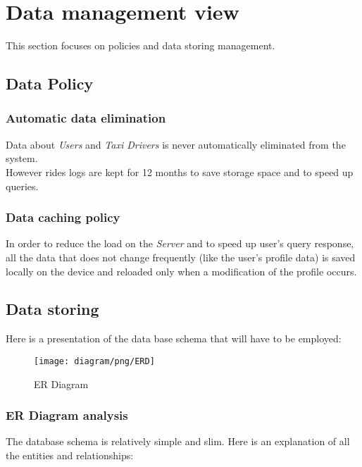 \section{Data management view} %
\label{sec:data_management}
This section focuses on policies and data storing management.\\
\subsection{Data Policy} %
\label{sub:data_policy}
\subsubsection{Automatic data elimination} %
\label{ssub:data_elimination}
Data about \emph{Users} and \emph{Taxi Drivers} is never automatically eliminated from the system.\\
However rides logs are kept for 12 months to save storage space and to speed up queries.
\subsubsection{Data caching policy} %
\label{ssub:data_caching}
In order to reduce the load on the \emph{Server} and to speed up user's query response, all the data that does not change frequently (like the user's profile data) is saved locally on the device and reloaded only when a modification of the profile occurs.

\subsection{Data storing} %
Here is a presentation of the data base schema that will have to be employed:
\newpage
\label{sub:data_storing}
\begin{figure}[h!t]
\caption{ER Diagram}
\texttt{[image: diagram/png/ERD]}
\centering
\end{figure}
\newpage

\subsubsection{ER Diagram analysis} %
\label{ssub:er_diagram_analysis}

The database schema is relatively simple and slim.
Here is an explanation of all the entities and relationships:

